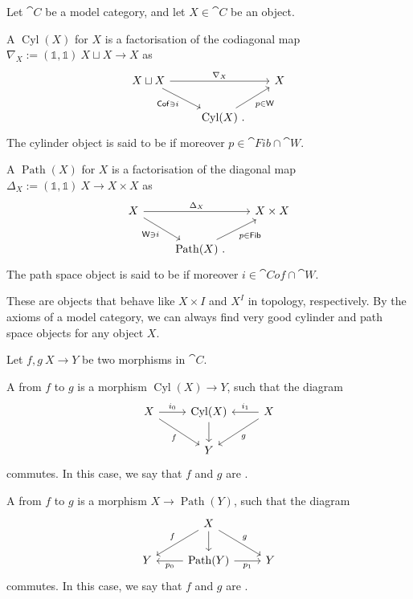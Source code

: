 \begin{definition}
    Let $\cat C$ be a model category,
    and let $X\in\cat{C}$ be an object.
    \begin{itms}
        \item A  $\operatorname{Cyl}(X)$ for $X$ is a factorisation
        of the codiagonal map $\nabla_X:=(\mathbb1,\mathbb1)\:X\sqcup X\to X$ as
        \[ \begin{tikzcd}
            X\sqcup X\ar[rr,"\nabla_X"]\ar[dr,"\cat{Cof}\ni i"'] &   & X \\
            & \operatorname{Cyl}(X)\rlap{\ .}\ar[ur,"p\in\cat{W}"'] &   
        \end{tikzcd} \]
        The cylinder object is said to be  if moreover $p\in\cat{Fib}\cap\cat{W}$.

        \item A  $\operatorname{Path}(X)$ for $X$ is a factorisation
        of the diagonal map $\Delta_X:=(\mathbb1,\mathbb1)\:X\to X\times X$ as
        \[ \begin{tikzcd}
            X\ar[rr,"\Delta_X"]\ar[dr,"\cat{W}\ni i"'] &   & X\times X \\
            & \operatorname{Path}(X)\rlap{\ .}\ar[ur,"p\in\cat{Fib}"'] &   
        \end{tikzcd} \]
        The path space object is said to be  if moreover $i\in\cat{Cof}\cap\cat{W}$.
    \end{itms}
\end{definition}

These are objects that behave like $X\times I$ and $X^I$
in topology, respectively.
By the axioms of a model category, we can always find
very good cylinder and path space objects
for any object $X$.

\begin{definition}
    Let $f,g\:X\to Y$ be two morphisms in $\cat C$.
    \begin{itms}
        \item A  from $f$ to $g$ is a morphism $\operatorname{Cyl}(X)\to Y$,
        such that the diagram
        \[ \begin{tikzcd}
            X\ar[r,"i_0"]\ar[dr,"f"'] & \operatorname{Cyl}(X)\ar[d] & X\ar[l,"i_1"']\ar[dl,"g"] \\
            & Y &   
        \end{tikzcd} \]
        commutes. In this case, we say that
        $f$ and $g$ are .

        \item A  from $f$ to $g$ is a morphism $X\to\operatorname{Path}(Y)$,
        such that the diagram
        \[ \begin{tikzcd}
            & X\ar[dl,"f"']\ar[d]\ar[dr,"g"] &   \\
            Y & \operatorname{Path}(Y)\ar[l,"p_0"]\ar[r,"p_1"'] & Y
        \end{tikzcd} \]
        commutes. In this case, we say that
        $f$ and $g$ are .
    \end{itms}
\end{definition}

